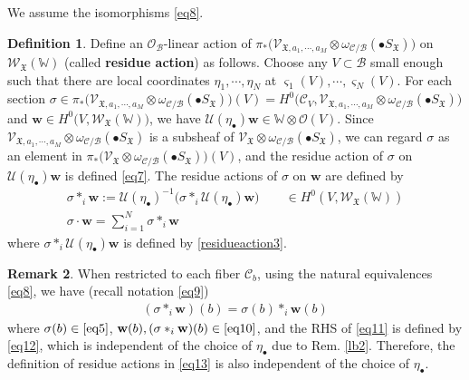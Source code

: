 \documentclass[11pt,b5paper,notitlepage]{article}
\theoremstyle{definition}
\newtheorem{df}{Definition}[section]
\newtheorem{rem}[df]{Remark}
\theoremstyle{plain}
\newcommand{\mc}{\mathcal}
\newcommand{\SV}{\mathscr{V}}
\newcommand{\blt}{\bullet}
\newcommand{\Wbb}{\mathbb W}
\newcommand{\wbf}{\mathbf w}
\newcommand{\<}{\left\langle}
\renewcommand{\>}{\right\rangle}
\newcommand{\MO}{\mathcal{O}}
\newcommand{\MU}{\mathcal{U}}
\newcommand{\MC}{\mathcal{C}}
\newcommand{\MB}{\mathcal{B}}
\newcommand{\fx}{\mathfrak{X}}
\newcommand{\SW}{\mathscr{W}}
\numberwithin{equation}{section}
\begin{document}
We assume the isomorphisms \eqref{eq8}.
\begin{df}
Define an $\mc O_{\mc B}$-linear action of $\pi_*\big(\SV_{\fx,a_1,\cdots,a_M}\otimes \omega_{\MC/\MB}(\blt S_\fx)\big)$ on $\SW_\fx(\Wbb)$ (called \textbf{residue action})  as follows. Choose any $V\subset \MB$ small enough such that there are local coordinates $\eta_1,\cdots,\eta_N$ at $\varsigma_1(V),\cdots,\varsigma_N(V)$. For each section $\sigma\in \pi_*\big(\SV_{\fx,a_1,\cdots,a_M}\otimes \omega_{\MC/\MB}(\blt S_\fx)\big)(V)=H^0\big(\MC_V,\SV_{\fx,a_1,\cdots,a_M}\otimes \omega_{\MC/\MB}(\blt S_\fx)\big)$ and $\wbf\in H^0\big(V,\SW_\fx(\Wbb)\big)$, we have $\MU(\eta_\blt)\wbf\in \Wbb\otimes \MO(V)$. Since $\SV_{\fx,a_1,\cdots,a_M}\otimes \omega_{\MC/\MB}(\blt S_\fx)$ is a subsheaf of $\SV_{\fx}\otimes \omega_{\MC/\MB}(\blt S_\fx)$, we can regard $\sigma$ as an element in $\pi_*\big(\SV_{\fx}\otimes \omega_{\MC/\MB}(\blt S_\fx)\big)(V)$, and the residue action of $\sigma$ on $\MU(\eta_\blt)\wbf$ is defined \eqref{eq7}. The residue actions of $\sigma$ on $\wbf$ are defined by
\begin{subequations}\label{eq13}
\begin{gather}
\sigma *_i \wbf:=\MU(\eta_\blt)^{-1}\big(\sigma *_i \MU(\eta_\blt)\wbf\big)\qquad\in H^0(V,\SW_\fx(\Wbb))  \label{eq50}\\
\sigma \cdot \wbf=\sum_{i=1}^N\sigma*_i \wbf
\end{gather}
\end{subequations}
where $\sigma *_i \MU(\eta_\blt)\wbf$ is defined by \eqref{residueaction3}.
\end{df}




\begin{rem}\label{lb13}
When restricted to each fiber $\mc C_b$, using the natural equivalences \eqref{eq8}, we have (recall notation \eqref{eq9})
\begin{align}
(\sigma *_i\wbf)(b)=\sigma(b) *_i \wbf(b) \label{eq11}
\end{align}
where $\sigma(b)\in\eqref{eq5}$, $\wbf(b),(\sigma *_i\wbf)(b)\in\eqref{eq10}$, and the RHS of \eqref{eq11} is defined by \eqref{eq12}, which is independent of the choice of $\eta_\blt$ due to Rem. \ref{lb2}. Therefore, the definition of residue actions in \eqref{eq13} is also independent of the choice of $\eta_\blt$.
\end{rem}
\end{document}
